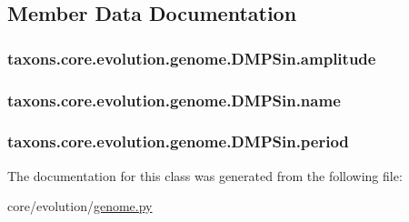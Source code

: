 \subsection{Member Data Documentation}
\subsubsection[{\texorpdfstring{amplitude}{amplitude}}]{\setlength{\rightskip}{0pt plus 5cm}taxons.\+core.\+evolution.\+genome.\+D\+M\+P\+Sin.\+amplitude}\hypertarget{classtaxons_1_1core_1_1evolution_1_1genome_1_1_d_m_p_sin_a0ae08a3c803db2b4dafe9bf817179c43}{}\label{classtaxons_1_1core_1_1evolution_1_1genome_1_1_d_m_p_sin_a0ae08a3c803db2b4dafe9bf817179c43}
\subsubsection[{\texorpdfstring{name}{name}}]{\setlength{\rightskip}{0pt plus 5cm}taxons.\+core.\+evolution.\+genome.\+D\+M\+P\+Sin.\+name}\hypertarget{classtaxons_1_1core_1_1evolution_1_1genome_1_1_d_m_p_sin_a74df1cd58ac7a97c3e16565eca30346c}{}\label{classtaxons_1_1core_1_1evolution_1_1genome_1_1_d_m_p_sin_a74df1cd58ac7a97c3e16565eca30346c}
\subsubsection[{\texorpdfstring{period}{period}}]{\setlength{\rightskip}{0pt plus 5cm}taxons.\+core.\+evolution.\+genome.\+D\+M\+P\+Sin.\+period}\hypertarget{classtaxons_1_1core_1_1evolution_1_1genome_1_1_d_m_p_sin_a91a355f3c6e4075d6b143fa019ba25ce}{}\label{classtaxons_1_1core_1_1evolution_1_1genome_1_1_d_m_p_sin_a91a355f3c6e4075d6b143fa019ba25ce}


The documentation for this class was generated from the following file\+:\begin{DoxyCompactItemize}
\item 
core/evolution/\hyperlink{genome_8py}{genome.\+py}\end{DoxyCompactItemize}
